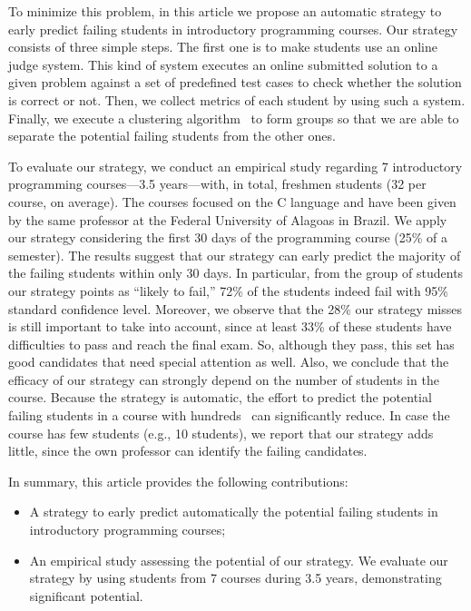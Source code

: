 To minimize this problem, in this article we propose an automatic strategy to early predict failing students in introductory programming courses. Our strategy consists of three simple steps. The first one is to make students use an online judge system. This kind of system executes an online submitted solution to a given problem against a set of predefined test cases to check whether the solution is correct or not. Then, we collect metrics of each student by using such a system. Finally, we execute a clustering algorithm~\cite{hartigan-clustering-algorithms-1975} to form groups so that we are able to separate the potential failing students from the other ones.

To evaluate our strategy, we conduct an empirical study regarding 7 introductory programming courses---3.5 years---with, in total, \totalStudents freshmen students (32 per course, on average). The courses focused on the C language and have been given by the same professor at the Federal University of Alagoas in Brazil. We apply our strategy considering the first 30 days of the programming course (25\% of a semester). The results suggest that our strategy can early predict the majority of the failing students within only 30 days. In particular, from the group of students our strategy points as ``likely to fail,'' 72\% of the students indeed fail with 95\% standard confidence level. Moreover, we observe that the 28\% our strategy misses is still important to take into account, since at least 33\% of these students have difficulties to pass and reach the final exam. So, although they pass, this set has good candidates that need special attention as well. Also, we conclude that the efficacy of our strategy can strongly depend on the number of students in the course. Because the strategy is automatic, the effort to predict the potential failing students in a course with hundreds~\cite{bennedsen-sigcse-failure-rates-2007} can significantly reduce. In case the course has few students (e.g., 10 students), we report that our strategy adds little, since the own professor can identify the failing candidates.


In summary, this article provides the following contributions:

\begin{itemize}

	\item A strategy to early predict automatically the potential failing students in introductory programming courses;
	
	\item An empirical study assessing the potential of our strategy. We evaluate our strategy by using \totalStudents students from 7 courses during 3.5 years, demonstrating significant potential.

\end{itemize}

